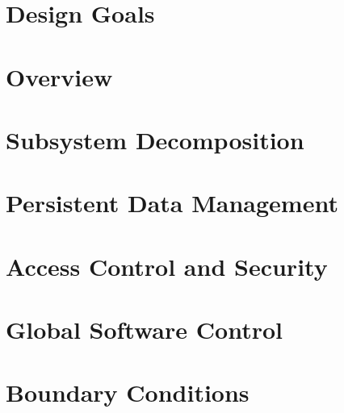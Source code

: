 \section{Design Goals}

\section{Overview}

\section{Subsystem Decomposition}
\label{sec:subsystems}


\section{Persistent Data Management}

\section{Access Control and Security}

\section{Global Software Control}

\section{Boundary Conditions}


